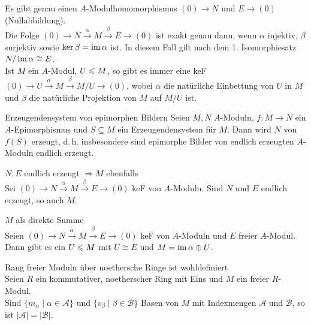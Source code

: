 \begin{Bem}
    Es gibt genau einen $A$-Modulhomomorphismus $(0) \rightarrow N$
    und $E \rightarrow (0)$ (Nullabbildung). \\
    Die Folge $(0) \rightarrow N \xrightarrow{\alpha} M
    \xrightarrow{\beta} E \rightarrow (0)$
    ist exakt genau dann, wenn $\alpha$ injektiv, $\beta$ surjektiv
    sowie $\ker \beta = \operatorname{im} \alpha$ ist.
    In diesem Fall gilt nach dem 1. Isomorphiesatz $N/\operatorname{im} \alpha \cong E$. \\
    Ist $M$ ein $A$-Modul, $U \leqslant M$, so gibt es immer eine keF
    $(0) \rightarrow U \xrightarrow{\alpha} M
    \xrightarrow{\beta} M/U \rightarrow (0)$, wobei
    $\alpha$ die natürliche Einbettung von $U$ in $M$ und
    $\beta$ die natürliche Projektion von $M$ auf $M/U$ ist.
\end{Bem}

\begin{Satz}{Erzeugendensystem von epimorphen Bildern}
    Seien $M, N$ $A$-Moduln, $f: M \rightarrow N$ ein $A$-Epimorphismus und
    $S \subseteq M$ ein Erzeugendensystem für $M$.
    Dann wird $N$ von $f(S)$ erzeugt, d.\,h. insbesondere sind
    epimorphe Bilder von endlich erzeugten $A$-Moduln endlich erzeugt.
\end{Satz}

\begin{Satz}{$N, E$ endlich erzeugt $\Rightarrow M$ ebenfalls} \\
    Sei $(0) \rightarrow N \xrightarrow{\alpha} M
    \xrightarrow{\beta} E \rightarrow (0)$ keF von $A$-Moduln.
    Sind $N$ und $E$ endlich erzeugt, so auch $M$.
\end{Satz}

\begin{Satz}{$M$ als direkte Summe} \\
    Seien $(0) \rightarrow N \xrightarrow{\alpha} M
    \xrightarrow{\beta} E \rightarrow (0)$ keF von $A$-Moduln
    und $E$ freier $A$-Modul. \\
    Dann gibt es ein $U \leqslant M$ mit $U \cong E$ und $M = \operatorname{im} \alpha \oplus U$.
\end{Satz}

\begin{Satz}{Rang freier Moduln über noethersche Ringe ist wohldefiniert} \\
    Seien $R$ ein kommutativer, noetherscher Ring mit Eins und $M$ ein
    freier $R$-Modul. \\
    Sind $\{m_\alpha \;|\; \alpha \in \mathcal{A}\}$ und
    $\{v_\beta \;|\; \beta \in \mathcal{B}\}$ Basen von $M$ mit
    Indexmengen $\mathcal{A}$ und $\mathcal{B}$, so ist
    $|\mathcal{A}| = |\mathcal{B}|$.
\end{Satz}

